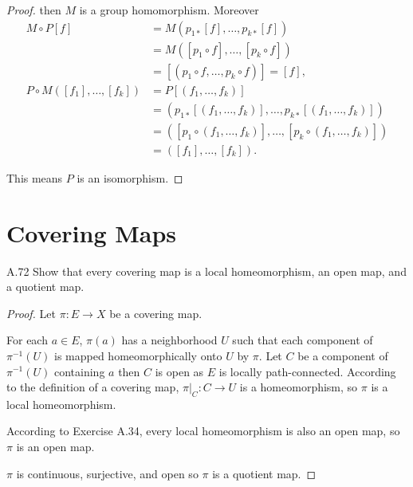 \begin{proof}
    then \( M \) is a group homomorphism. Moreover
    \begingroup
    \allowdisplaybreaks%
    \begin{align*}
        M \circ P[f]                        & = M(p_{1\ast}[f], \ldots, p_{k\ast}[f])                                                \\
                                            & = M([p_{1} \circ f], \ldots, [p_{k} \circ f])                                          \\
                                            & = [(p_{1} \circ f, \ldots, p_{k} \circ f)] = [f],                                      \\
        P \circ M([f_{1}], \ldots, [f_{k}]) & = P[(f_{1}, \ldots, f_{k})]                                                            \\
                                            & = (p_{1\ast}[(f_{1}, \ldots, f_{k})], \ldots, p_{k\ast}[(f_{1}, \ldots, f_{k})])       \\
                                            & = ([p_{1} \circ (f_{1}, \ldots, f_{k})], \ldots, [p_{k} \circ (f_{1}, \ldots, f_{k})]) \\
                                            & = ([f_{1}], \ldots, [f_{k}]).
    \end{align*}
    \endgroup

    This means \( P \) is an isomorphism.
\end{proof}

\section{Covering Maps}

\begin{exercise}{A.72}
    Show that every covering map is a local homeomorphism, an open map, and a quotient map.
\end{exercise}

\begin{proof}
    Let \( \pi: E \to X \) be a covering map.

    For each \( a \in E \), \( \pi(a) \) has a neighborhood \( U \) such that each component of \( \pi^{-1}(U) \) is mapped homeomorphically onto \( U \) by \( \pi \). Let \( C \) be a component of \( \pi^{-1}(U) \) containing \( a \) then \( C \) is open as \( E \) is locally path-connected. According to the definition of a covering map, \( \pi\vert_{C}: C \to U \) is a homeomorphism, so \( \pi \) is a local homeomorphism.

    According to Exercise A.34, every local homeomorphism is also an open map, so \( \pi \) is an open map.

    \( \pi \) is continuous, surjective, and open so \( \pi \) is a quotient map.
\end{proof}

